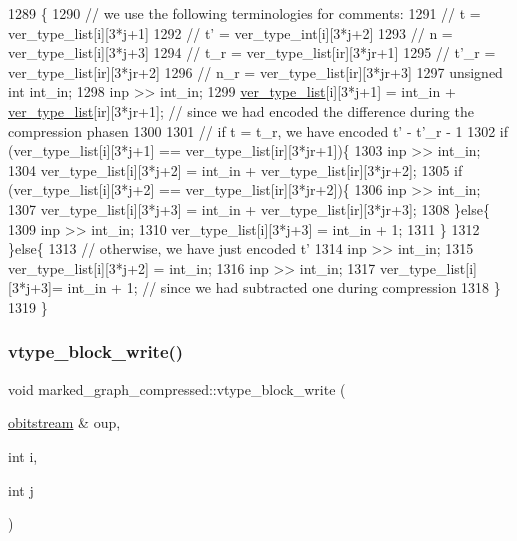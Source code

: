 \begin{DoxyCode}
1289                                                                                            \{
1290   \textcolor{comment}{// we use the following terminologies for comments:}
1291   \textcolor{comment}{// t = ver\_type\_list[i][3*j+1]}
1292   \textcolor{comment}{// t' = ver\_type\_int[i][3*j+2]}
1293   \textcolor{comment}{// n = ver\_type\_list[i][3*j+3]}
1294   \textcolor{comment}{// t\_r = ver\_type\_list[ir][3*jr+1]}
1295   \textcolor{comment}{// t'\_r = ver\_type\_list[ir][3*jr+2]}
1296   \textcolor{comment}{// n\_r = ver\_type\_list[ir][3*jr+3]}
1297   \textcolor{keywordtype}{unsigned} \textcolor{keywordtype}{int} int\_in;
1298   inp >> int\_in;
1299   \hyperlink{classmarked__graph__compressed_af2e3e55223d436628a02758dfae88493}{ver\_type\_list}[i][3*j+1] = int\_in + \hyperlink{classmarked__graph__compressed_af2e3e55223d436628a02758dfae88493}{ver\_type\_list}[ir][3*jr+1]; \textcolor{comment}{// since we had
       encoded the difference during the compression phasen}
1300  
1301   \textcolor{comment}{// if t = t\_r, we have encoded t' - t'\_r - 1}
1302   \textcolor{keywordflow}{if} (ver\_type\_list[i][3*j+1] == ver\_type\_list[ir][3*jr+1])\{
1303     inp >> int\_in;
1304     ver\_type\_list[i][3*j+2] = int\_in + ver\_type\_list[ir][3*jr+2];
1305     \textcolor{keywordflow}{if} (ver\_type\_list[i][3*j+2] == ver\_type\_list[ir][3*jr+2])\{
1306       inp >> int\_in; 
1307       ver\_type\_list[i][3*j+3] = int\_in +  ver\_type\_list[ir][3*jr+3];
1308     \}\textcolor{keywordflow}{else}\{
1309       inp >> int\_in; 
1310       ver\_type\_list[i][3*j+3] = int\_in +  1;
1311     \}
1312   \}\textcolor{keywordflow}{else}\{
1313     \textcolor{comment}{// otherwise, we have just encoded t'}
1314     inp >> int\_in;
1315     ver\_type\_list[i][3*j+2] = int\_in;
1316     inp >> int\_in;
1317     ver\_type\_list[i][3*j+3]= int\_in + 1; \textcolor{comment}{// since we had subtracted one during compression}
1318   \}
1319 \}
\end{DoxyCode}
\mbox{\label{classmarked__graph__compressed_a31f9ea72682f9072d0f90faf58a603fe}} 
\subsubsection{\texorpdfstring{vtype\+\_\+block\+\_\+write()}{vtype\_block\_write()}\hspace{0.1cm}{\footnotesize\ttfamily [1/2]}}
{\footnotesize\ttfamily void marked\+\_\+graph\+\_\+compressed\+::vtype\+\_\+block\+\_\+write (\begin{DoxyParamCaption}\item[{\hyperlink{classobitstream}{obitstream} \&}]{oup,  }\item[{int}]{i,  }\item[{int}]{j }\end{DoxyParamCaption})}

